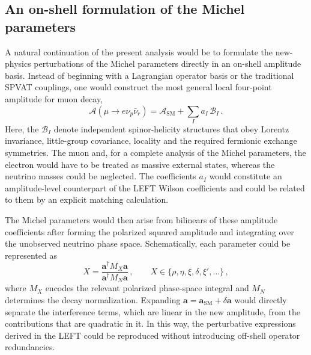 
\subsection{An on-shell formulation of the Michel parameters}

A natural continuation of the present analysis would be to formulate the
new-physics perturbations of the Michel parameters directly in an on-shell
amplitude basis. Instead of beginning with a Lagrangian operator basis or the
traditional SPVAT couplings, one would construct the most general local
four-point amplitude for muon decay,
\begin{equation}
    \mathcal A\!\left(\mu\to e\nu_p\bar\nu_r\right)
    = \mathcal A_{\mathrm{SM}}
    + \sum_I a_I\,\mathcal B_I\,.
    \label{eq:outlook-onshell-amplitude}
\end{equation}
Here, the $\mathcal B_I$ denote independent spinor-helicity structures that
obey Lorentz invariance, little-group covariance, locality and the required
fermionic exchange symmetries. The muon and, for a complete analysis of the
Michel parameters, the electron would have to be treated as massive external
states, whereas the neutrino masses could be neglected. The coefficients
$a_I$ would constitute an amplitude-level counterpart of the LEFT Wilson
coefficients and could be related to them by an explicit matching calculation.

The Michel parameters would then arise from bilinears of these amplitude
coefficients after forming the polarized squared amplitude and integrating
over the unobserved neutrino phase space. Schematically, each parameter could
be represented as
\begin{equation}
    X
    = \frac{\boldsymbol a^{\dagger} M_X\boldsymbol a}
           {\boldsymbol a^{\dagger} M_N\boldsymbol a}\,,
    \qquad
    X\in\{\rho,\eta,\xi,\delta,\xi',\ldots\}\,,
    \label{eq:outlook-michel-bilinear}
\end{equation}
where $M_X$ encodes the relevant polarized phase-space integral and $M_N$
determines the decay normalization. Expanding
$\boldsymbol a=\boldsymbol a_{\mathrm{SM}}+\delta\boldsymbol a$ would directly
separate the interference terms, which are linear in the new amplitude, from
the contributions that are quadratic in it. In this way, the perturbative
expressions derived in the LEFT could be reproduced without introducing
off-shell operator redundancies.

